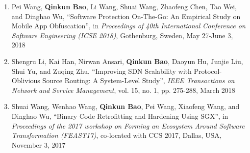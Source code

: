 \begin{enumerate}
\item Pei Wang, \textbf{Qinkun Bao}, Li Wang, Shuai Wang, Zhaofeng Chen, Tao Wei, and Dinghao Wu, ``Software Protection On-The-Go: An Empirical Study on Mobile App Obfuscation'', in \emph{Proceedings of 40th International Conference on Software Engineering (ICSE 2018)}, Gothenburg, Sweden, May 27-June 3, 2018
  
\item Shengru Li, Kai Han, Nirwan Ansari, \textbf{Qinkun Bao}, Daoyun Hu, Junjie Liu, Shui Yu, and Zuqing Zhu, ``Improving SDN Scalability with Protocol-Oblivious Source Routing: A System-Level Study'', \emph{IEEE Transactions on Network and Service Management}, vol. 15, no. 1, pp. 275-288, March 2018
 
\item Shuai Wang, Wenhao Wang, \textbf{Qinkun Bao}, Pei Wang, Xiaofeng Wang, and Dinghao Wu, ``Binary Code Retrofitting and Hardening Using SGX'', in \emph{Proceedings of the 2017 workshop on Forming an Ecosystem Around Software Transformation (FEAST17)}, co-located with CCS 2017, Dallas, USA, November 3, 2017
\end{enumerate}





